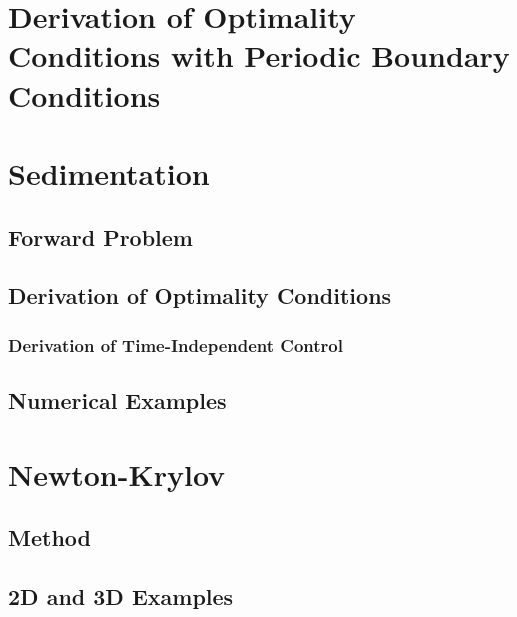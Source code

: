 \documentclass[11pt, a4paper]{article}
\theoremstyle{definition}
\begin{document}
	
	\section{Derivation of Optimality Conditions with Periodic Boundary Conditions}
	
	\section{Sedimentation}
	\subsection{Forward Problem}
	
	\subsection{Derivation of Optimality Conditions}
	
	\subsubsection{Derivation of Time-Independent Control}
	
	
	\subsection{Numerical Examples}
	
	
	
	\section{Newton-Krylov}
	\subsection{Method}
	\subsection{2D and 3D Examples}
	


	
	\pagebreak	
	
	
	
\end{document}

